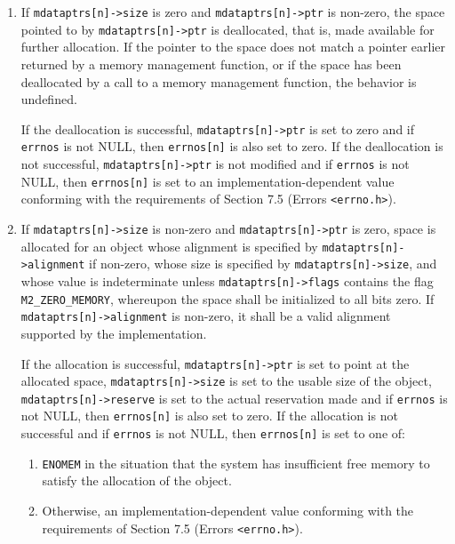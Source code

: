 \documentclass[wd]{isov2}
\begin{document}
{\begin{enumerate}
\begin{enumerate}
\item If \texttt{mdataptrs[n]->size} is zero and \texttt{mdataptrs[n]->ptr} is non-zero, the space pointed to by \texttt{mdataptrs[n]->ptr} is deallocated, that is, made available for further allocation. If the pointer to the space does not match a pointer earlier returned by a memory management function, or if the space has been deallocated by a call to a memory management function, the behavior is undefined.

If the deallocation is successful, \texttt{mdataptrs[n]->ptr} is set to zero and if \texttt{errnos} is not NULL, then \texttt{errnos[n]} is also set to zero. If the deallocation is not successful, \texttt{mdataptrs[n]->ptr} is not modified and if \texttt{errnos} is not NULL, then \texttt{errnos[n]} is set to an implementation-dependent value conforming with the requirements of Section 7.5 (Errors \texttt{<errno.h>}).

\item If \texttt{mdataptrs[n]->size} is non-zero and \texttt{mdataptrs[n]->ptr} is zero, space is allocated for an object whose alignment is specified by \texttt{mdataptrs[n]->alignment} if non-zero, whose size is specified by \texttt{mdataptrs[n]->size}, and whose value is indeterminate unless \texttt{mdataptrs[n]->flags} contains the flag \texttt{M2\_ZERO\_MEMORY}, whereupon the space shall be initialized to all bits zero. If \texttt{mdataptrs[n]->alignment} is non-zero, it shall be a valid alignment supported by the implementation.

If the allocation is successful, \texttt{mdataptrs[n]->ptr} is set to point at the allocated space, \texttt{mdataptrs[n]->size} is set to the usable size of the object, \texttt{mdataptrs[n]->reserve} is set to the actual reservation made and if \texttt{errnos} is not NULL, then \texttt{errnos[n]} is also set to zero. If the allocation is not successful and if \texttt{errnos} is not NULL, then \texttt{errnos[n]} is set to one of:
\begin{enumerate}
\item \texttt{ENOMEM} in the situation that the system has insufficient free memory to satisfy the allocation of the object.
\item Otherwise, an implementation-dependent value conforming with the requirements of Section 7.5 (Errors \texttt{<errno.h>}).
\end{enumerate}


\end{enumerate}
\end{enumerate}}
\end{document}
